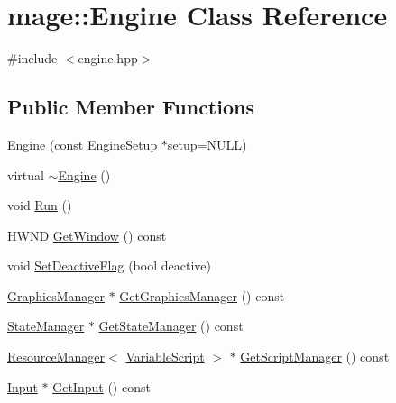 \hypertarget{classmage_1_1_engine}{}\section{mage\+:\+:Engine Class Reference}
\label{classmage_1_1_engine}


{\ttfamily \#include $<$engine.\+hpp$>$}

\subsection*{Public Member Functions}
\begin{DoxyCompactItemize}
\item 
\hyperlink{classmage_1_1_engine_a5b49f3adf1dd889bb38f5325fd6db317}{Engine} (const \hyperlink{structmage_1_1_engine_setup}{Engine\+Setup} $\ast$setup=N\+U\+LL)
\item 
virtual \hyperlink{classmage_1_1_engine_a34628556f8397d70ed018d71e343c2f5}{$\sim$\+Engine} ()
\item 
void \hyperlink{classmage_1_1_engine_afdc05e214d3f47a6ea3a40dfffd86f80}{Run} ()
\item 
H\+W\+ND \hyperlink{classmage_1_1_engine_a1c5f9d8c68045b36f404251359aa41e4}{Get\+Window} () const
\item 
void \hyperlink{classmage_1_1_engine_a942bfa9892fa79bb1068d7c7ec4e6732}{Set\+Deactive\+Flag} (bool deactive)
\item 
\hyperlink{classmage_1_1_graphics_manager}{Graphics\+Manager} $\ast$ \hyperlink{classmage_1_1_engine_a7dde353835870f5db50143a1576b58e2}{Get\+Graphics\+Manager} () const
\item 
\hyperlink{classmage_1_1_state_manager}{State\+Manager} $\ast$ \hyperlink{classmage_1_1_engine_a4f35bccc3784de531245a2549d537745}{Get\+State\+Manager} () const
\item 
\hyperlink{classmage_1_1_resource_manager}{Resource\+Manager}$<$ \hyperlink{classmage_1_1_variable_script}{Variable\+Script} $>$ $\ast$ \hyperlink{classmage_1_1_engine_af55c457336dcbc0e940578425c74d868}{Get\+Script\+Manager} () const
\item 
\hyperlink{classmage_1_1_input}{Input} $\ast$ \hyperlink{classmage_1_1_engine_a55d099d040e8895803f15e214f3b6d9e}{Get\+Input} () const
\end{DoxyCompactItemize}
